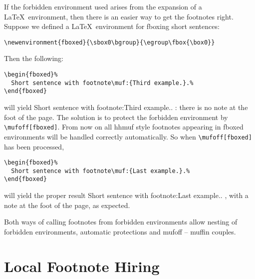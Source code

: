\documentclass[11pt]{article}
\makeatletter
\def\packagename#1{{\sffamily #1}}     %
\def\macroname#1{{\ttfamily\@ttbs#1}}  %
\def\envirname#1{{\ttfamily #1}}       %
\def\hhmuf{\packagename{hhmuf}\xspace}
\def\={\verb=}
\def\<#1>{\macroname{#1}}
\def\:{\linebreak[1]}
\makeatother
\begin{document}
If the forbidden environment used arises from the expansion of a
\LaTeX\ environment, then there is an easier way to get the footnotes
right. Suppose we defined a \LaTeX\ environment for \<fbox>ing short
sentences:
\begin{verbatim}
\newenvironment{fboxed}{\sbox0\bgroup}{\egroup\fbox{\box0}}
\end{verbatim}
\newenvironment{fboxed}{\sbox0\bgroup}{\egroup\fbox{\box0}}
Then the following:
\begin{verbatim}
\begin{fboxed}%
  Short sentence with footnote\muf:{Third example.}.%
\end{fboxed}
\end{verbatim}
will yield \begin{fboxed}%
  Short sentence with footnote\muf:{Third example.}.%
\end{fboxed}: there is no note at the foot of the page.
The solution is to protect the forbidden environment by
\=\mufoff=\:\=[fboxed]=. From now on all \hhmuf style footnotes appearing
in \envirname{fboxed} environments will be handled correctly automatically.
So when \=\mufoff=\:\=[fboxed]= has been processed,
\begin{verbatim}
\begin{fboxed}%
  Short sentence with footnote\muf:{Last example.}.%
\end{fboxed}
\end{verbatim}
will yield the proper result \mufoff[fboxed]\begin{fboxed}%
  Short sentence with footnote\muf:{Last example.}.%
\end{fboxed}, with a note at the foot of the page, as expected.

Both ways of calling footnotes from forbidden environments allow
nesting of forbidden environments, automatic protections and
\<mufoff> -- \<muffin> couples.

\section{Local Footnote Hiring}
\end{document}
